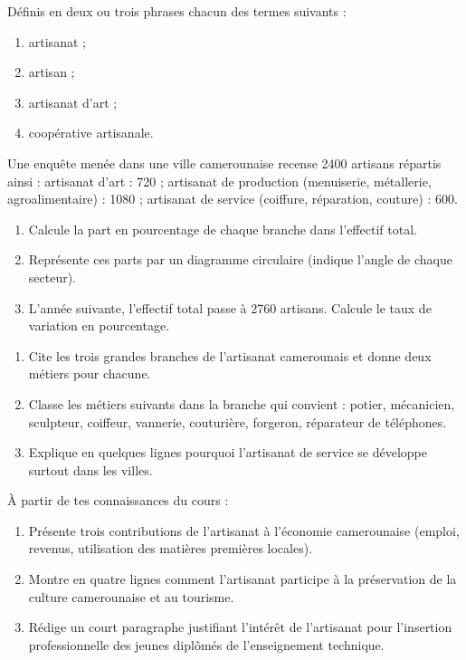 \documentclass[11pt]{article}
\newcounter{popsec}
\newcounter{popsub}
\newcommand{\courssub}[1]{%
  \stepcounter{popsub}%
  \par\vspace{9pt}\noindent{\popxbold\fontsize{11.5}{13}\selectfont\color{popink}{\color{poporange}\thepopsec.\thepopsub}\hspace{6pt}#1}\par\nopagebreak\vspace{4pt}
}
\begin{document}
\begin{exercice}[Définitions]
Définis en deux ou trois phrases chacun des termes suivants :
\begin{enumerate}
\item artisanat ;
\item artisan ;
\item artisanat d'art ;
\item coopérative artisanale.
\end{enumerate}
\end{exercice}

\begin{exercice}
Une enquête menée dans une ville camerounaise recense \num{2400} artisans répartis ainsi : artisanat d'art : 720 ; artisanat de production (menuiserie, métallerie, agroalimentaire) : \num{1080} ; artisanat de service (coiffure, réparation, couture) : 600.
\begin{enumerate}
\item Calcule la part en pourcentage de chaque branche dans l'effectif total.
\item Représente ces parts par un diagramme circulaire (indique l'angle de chaque secteur).
\item L'année suivante, l'effectif total passe à \num{2760} artisans. Calcule le taux de variation en pourcentage.
\end{enumerate}
\end{exercice}

\courssub{Je m'entraîne}

\begin{exercice}
\begin{enumerate}
\item Cite les trois grandes branches de l'artisanat camerounais et donne deux métiers pour chacune.
\item Classe les métiers suivants dans la branche qui convient : potier, mécanicien, sculpteur, coiffeur, vannerie, couturière, forgeron, réparateur de téléphones.
\item Explique en quelques lignes pourquoi l'artisanat de service se développe surtout dans les villes.
\end{enumerate}
\end{exercice}

\begin{exercice}
À partir de tes connaissances du cours :
\begin{enumerate}
\item Présente trois contributions de l'artisanat à l'économie camerounaise (emploi, revenus, utilisation des matières premières locales).
\item Montre en quatre lignes comment l'artisanat participe à la préservation de la culture camerounaise et au tourisme.
\item Rédige un court paragraphe justifiant l'intérêt de l'artisanat pour l'insertion professionnelle des jeunes diplômés de l'enseignement technique.
\end{enumerate}
\end{exercice}
\end{document}
